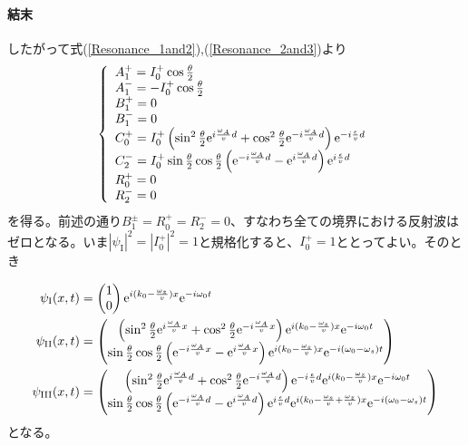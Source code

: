 \paragraph{結末}
したがって式(\ref{Resonance_1and2}),(\ref{Resonance_2and3})より
\begin{equation}
\left\{ \begin{array}{l}
A_1^+=I_0^+ \cos \frac{\theta}{2} \\
A_1^-=-I_0^+ \cos \frac{\theta}{2} \\
B_1^+=0 \\
B_1^-=0 \\
C_0^+=I_0^+\left(\sin^2 \frac{\theta}{2} \mathrm{e}^{i\frac{\omega_A}{v}d} +\cos^2 \frac{\theta}{2} \mathrm{e}^{-i\frac{\omega_A}{v}d} \right)  \mathrm{e}^{-i\frac{\epsilon}{v}d} \\
C_2^-=I_0^+ \sin\frac{\theta}{2}\cos\frac{\theta}{2} \left(\mathrm{e}^{-i\frac{\omega_A}{v}d}-\mathrm{e}^{i\frac{\omega_A}{v}d}\right) \mathrm{e}^{i\frac{\epsilon}{v}d}\\
R_0^+=0\\
R_2^-=0
\end{array} \right.
\end{equation}
を得る。前述の通り$B_1^\pm=R_0^+=R_2^-=0$、すなわち全ての境界における反射波はゼロとなる。いま$|\psi_\mathrm{I}|^2=|I_0^+|^2=1$と規格化すると、$I_0^+=1$ととってよい。そのとき

\begin{align}
\psi_\mathrm{I}(x,t)&=\begin{pmatrix} 1\\0\end{pmatrix} \mathrm{e}^{i (k_0-\frac{\omega_z}{v})x}\mathrm{e}^{-i\omega_0t}\\
\psi_\mathrm{II}(x,t)&=\begin{pmatrix} \left(\sin^2 \frac{\theta}{2} \mathrm{e}^{i\frac{\omega_A}{v}x} +\cos^2 \frac{\theta}{2} \mathrm{e}^{-i\frac{\omega_A}{v}x} \right) \mathrm{e}^{i(k_0-\frac{\omega_s}{v}) x} \mathrm{e}^{-i\omega_0 t} \\ \sin\frac{\theta}{2}\cos\frac{\theta}{2} \left(\mathrm{e}^{-i\frac{\omega_A}{v}x}-\mathrm{e}^{i\frac{\omega_A}{v}x}\right) \mathrm{e}^{i(k_0-\frac{\omega_s}{v}) x} \mathrm{e}^{-i(\omega_0-\omega_s) t}\end{pmatrix}\\
\psi_\mathrm{III}(x,t)&=\begin{pmatrix} \left(\sin^2 \frac{\theta}{2} \mathrm{e}^{i\frac{\omega_A}{v}d} +\cos^2 \frac{\theta}{2} \mathrm{e}^{-i\frac{\omega_A}{v}d} \right)\mathrm{e}^{-i\frac{\epsilon}{v}d} \mathrm{e}^{i(k_0-\frac{\omega_z}{v})x}\mathrm{e}^{-i\omega_0t} \\ \sin\frac{\theta}{2}\cos\frac{\theta}{2} \left(\mathrm{e}^{-i\frac{\omega_A}{v}d}-\mathrm{e}^{i\frac{\omega_A}{v}d}\right)  \mathrm{e}^{i\frac{\epsilon}{v}d} \mathrm{e}^{i(k_0-\frac{\omega_s}{v}+\frac{\omega_z}{v})x}\mathrm{e}^{-i(\omega_0-\omega_s)t} \end{pmatrix}
\end{align}
となる。

